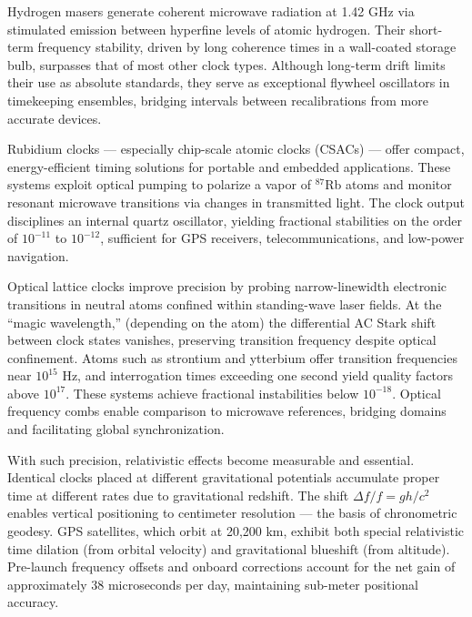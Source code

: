 Hydrogen masers generate coherent microwave radiation at 1.42 GHz via stimulated emission between hyperfine levels of atomic hydrogen. Their short-term frequency stability, driven by long coherence times in a wall-coated storage bulb, surpasses that of most other clock types. Although long-term drift limits their use as absolute standards, they serve as exceptional flywheel oscillators in timekeeping ensembles, bridging intervals between recalibrations from more accurate devices.

Rubidium clocks — especially chip-scale atomic clocks (CSACs) — offer compact, energy-efficient timing solutions for portable and embedded applications. These systems exploit optical pumping to polarize a vapor of $^{87}$Rb atoms and monitor resonant microwave transitions via changes in transmitted light. The clock output disciplines an internal quartz oscillator, yielding fractional stabilities on the order of $10^{-11}$ to $10^{-12}$, sufficient for GPS receivers, telecommunications, and low-power navigation.

Optical lattice clocks improve precision by probing narrow-linewidth electronic transitions in neutral atoms confined within standing-wave laser fields. At the “magic wavelength,” (depending on the atom) the differential AC Stark shift between clock states vanishes, preserving transition frequency despite optical confinement. Atoms such as strontium and ytterbium offer transition frequencies near $10^{15}$ Hz, and interrogation times exceeding one second yield quality factors above $10^{17}$. These systems achieve fractional instabilities below $10^{-18}$. Optical frequency combs enable comparison to microwave references, bridging domains and facilitating global synchronization.

With such precision, relativistic effects become measurable and essential. Identical clocks placed at different gravitational potentials accumulate proper time at different rates due to gravitational redshift. The shift $\Delta f/f = gh/c^2$ enables vertical positioning to centimeter resolution — the basis of chronometric geodesy. GPS satellites, which orbit at 20,200 km, exhibit both special relativistic time dilation (from orbital velocity) and gravitational blueshift (from altitude). Pre-launch frequency offsets and onboard corrections account for the net gain of approximately 38 microseconds per day, maintaining sub-meter positional accuracy.

